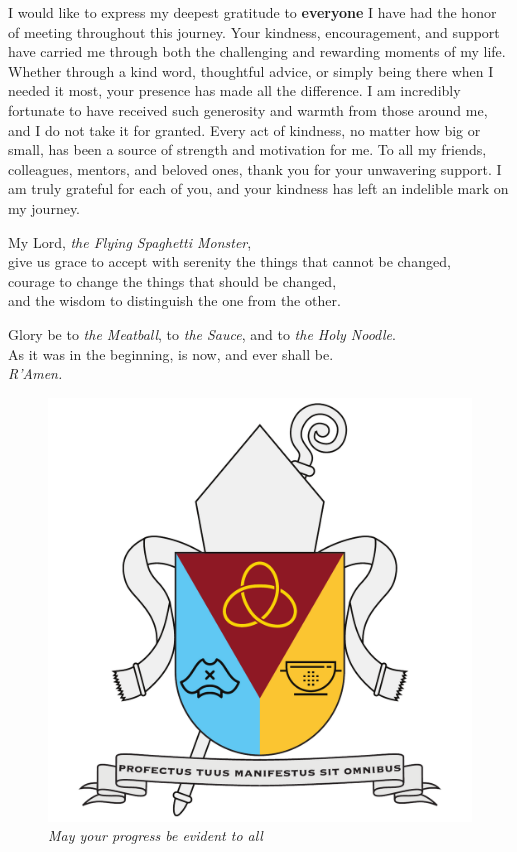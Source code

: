 \documentclass[11pt, a4paper, onecolumn, oneside]{report}
\begin{document}
        I would like to express my deepest gratitude to \textbf{everyone} I have had the honor of meeting throughout this journey. Your kindness, encouragement, and support have carried me through both the challenging and rewarding moments of my life. Whether through a kind word, thoughtful advice, or simply being there when I needed it most, your presence has made all the difference. I am incredibly fortunate to have received such generosity and warmth from those around me, and I do not take it for granted. Every act of kindness, no matter how big or small, has been a source of strength and motivation for me. To all my friends, colleagues, mentors, and beloved ones, thank you for your unwavering support. I am truly grateful for each of you, and your kindness has left an indelible mark on my journey.

        \begin{center}
            My Lord, \textit{the Flying Spaghetti Monster},\\
            give us grace to accept with serenity the things that cannot be changed,\\
            courage to change the things that should be changed,\\
            and the wisdom to distinguish the one from the other.

            \medspace

            Glory be to \textit{the Meatball}, to \textit{the Sauce}, and to \textit{the Holy Noodle}. \\
            As it was in the beginning, is now, and ever shall be. \\
            \textit{R'Amen.}
        \end{center}

        \begin{figure}[hp]
            \centering
            \includegraphics[width=10 cm]{Figures/Coat of arms.pdf}
            \caption*{\textit{May your progress be evident to all}}
        \end{figure}
    \clearpage

\hbox{ }
\thispagestyle{empty}
\clearpage
\end{document}
